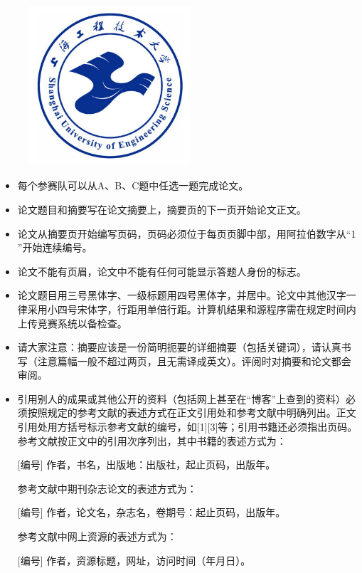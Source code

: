 \documentclass[bwprint]{suesmmthesis}
\begin{document}
    \begin{center}
        \begin{figure}
            \centering
            \includegraphics[width=6cm,height=6cm]{sues-logo.jpg}
        \end{figure}
        \shadowoffsetx{0.5pt}
        \shadowoffsety{0.5pt}
        \xinwei{}

        \xinwei{}

        \xinwei{}
    \end{center}

    \vspace{0.5cm}
    \begin{itemize}\fangsong
        \item 每个参赛队可以从A、B、C题中任选一题完成论文。
        \item 论文题目和摘要写在论文摘要上，摘要页的下一页开始论文正文。
        \item 论文从摘要页开始编写页码，页码必须位于每页页脚中部，用阿拉伯数字从“1 ”开始连续编号。
        \item 论文不能有页眉，论文中不能有任何可能显示答题人身份的标志。
        \item 论文题目用三号黑体字、一级标题用四号黑体字，并居中。论文中其他汉字一律采用小四号宋体字，行距用单倍行距。计算机结果和源程序需在规定时间内上传竞赛系统以备检查。
        \item 请大家注意：摘要应该是一份简明扼要的详细摘要（包括关键词），请认真书写（注意篇幅一般不超过两页，且无需译成英文）。评阅时对摘要和论文都会审阅。
        \item 引用别人的成果或其他公开的资料（包括网上甚至在“博客”上查到的资料）必须按照规定的参考文献的表述方式在正文引用处和参考文献中明确列出。正文引用处用方括号标示参考文献的编号，如[1][3]等；引用书籍还必须指出页码。参考文献按正文中的引用次序列出，其中书籍的表述方式为：
        
        \hspace{2em}[编号] 作者，书名，出版地：出版社，起止页码，出版年。

        参考文献中期刊杂志论文的表述方式为：

        \hspace{2em}[编号] 作者，论文名，杂志名，卷期号：起止页码，出版年。

        参考文献中网上资源的表述方式为：

        \hspace{2em}[编号] 作者，资源标题，网址，访问时间（年月日）。
    \end{itemize}
\end{document}
